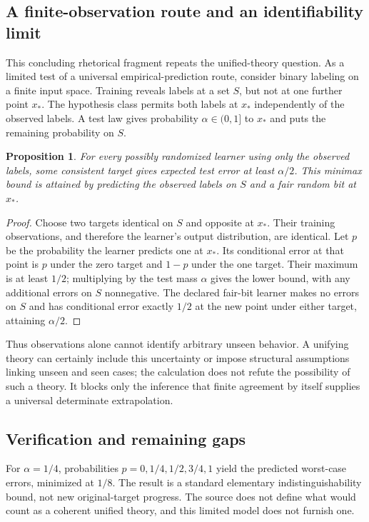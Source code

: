 \documentclass[11pt]{article}
\newtheorem{proposition}{Proposition}
\begin{document}
\subsection{A finite-observation route and an identifiability limit}
This concluding rhetorical fragment repeats the unified-theory question. As a limited test of a universal empirical-prediction route, consider binary labeling on a finite input space. Training reveals labels at a set $S$, but not at one further point $x_*$. The hypothesis class permits both labels at $x_*$ independently of the observed labels. A test law gives probability $\alpha\in(0,1]$ to $x_*$ and puts the remaining probability on $S$.
\begin{proposition}
For every possibly randomized learner using only the observed labels, some consistent target gives expected test error at least $\alpha/2$. This minimax bound is attained by predicting the observed labels on $S$ and a fair random bit at $x_*$.
\end{proposition}
\begin{proof}
Choose two targets identical on $S$ and opposite at $x_*$. Their training observations, and therefore the learner's output distribution, are identical. Let $p$ be the probability the learner predicts one at $x_*$. Its conditional error at that point is $p$ under the zero target and $1-p$ under the one target. Their maximum is at least $1/2$; multiplying by the test mass $\alpha$ gives the lower bound, with any additional errors on $S$ nonnegative. The declared fair-bit learner makes no errors on $S$ and has conditional error exactly $1/2$ at the new point under either target, attaining $\alpha/2$.
\end{proof}
Thus observations alone cannot identify arbitrary unseen behavior. A unifying theory can certainly include this uncertainty or impose structural assumptions linking unseen and seen cases; the calculation does not refute the possibility of such a theory. It blocks only the inference that finite agreement by itself supplies a universal determinate extrapolation.
\subsection{Verification and remaining gaps}
For $\alpha=1/4$, probabilities $p=0,1/4,1/2,3/4,1$ yield the predicted worst-case errors, minimized at $1/8$. The result is a standard elementary indistinguishability bound, not new original-target progress. The source does not define what would count as a coherent unified theory, and this limited model does not furnish one.
\end{document}
